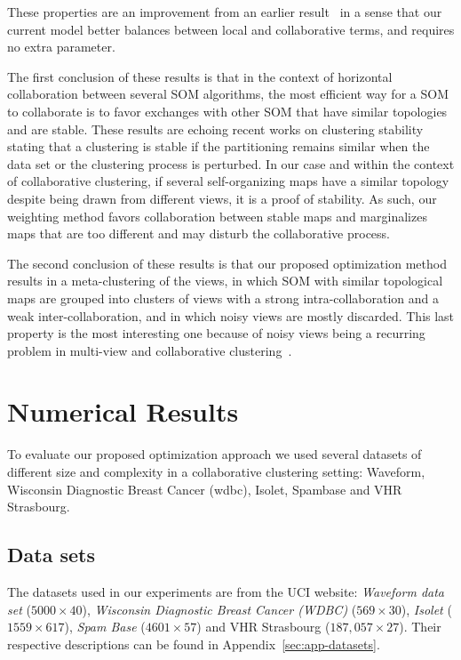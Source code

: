 These properties are an improvement from an earlier result~\cite{Sublime2017} in a sense that our current model better balances between local and collaborative terms, and requires no extra parameter.

The first conclusion of these results is that in the context of horizontal collaboration between several SOM algorithms, the most efficient way for a SOM to collaborate is to favor exchanges with other SOM that have similar topologies and are stable. These results are echoing recent works on clustering stability~\cite{stability2,vonLuxburg:2010:CSO:1774730.1774731} stating that  a clustering is stable if the partitioning remains similar when the data set or the clustering process is perturbed. 
In our case and within the context of collaborative clustering, if several self-organizing maps have a similar topology despite being drawn from different views, it is a proof of stability. As such, our weighting method favors collaboration between stable maps and marginalizes maps that are too different and may disturb the collaborative process.


The second conclusion of these results is that our proposed optimization method results in a meta-clustering of the views, in which SOM with similar topological maps are grouped into clusters of views with a strong intra-collaboration and a weak inter-collaboration, and in which noisy views are mostly discarded. This last property is the most interesting one because of noisy views being a recurring problem in multi-view and collaborative clustering~\cite{Cornuejols201881}.





\section{Numerical Results} 
\label{app:c}

To evaluate our proposed optimization approach we used several datasets of different size and complexity in a collaborative clustering setting: Waveform, Wisconsin Diagnostic Breast Cancer (wdbc), Isolet, Spambase and VHR Strasbourg.

\subsection{Data sets}
The datasets used in our experiments are from the UCI website: \textit{Waveform data set} ($5000 \times 40$), \textit{Wisconsin Diagnostic Breast Cancer (WDBC)} ($569 \times 30$), \textit{Isolet} ($1559 \times 617$), \textit{Spam Base} ($4601 \times 57$) and VHR Strasbourg ($187,057 \times 27$). Their respective descriptions can be found in Appendix~\ref{sec:app-datasets}.\\


